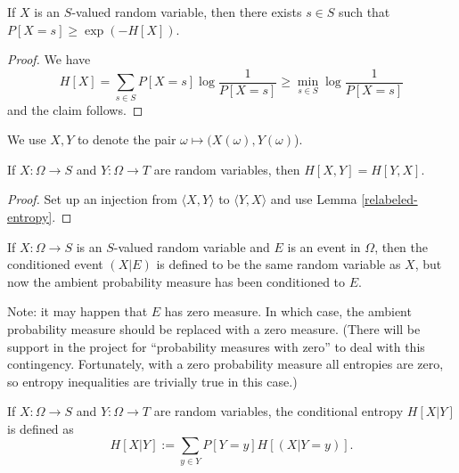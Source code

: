 \begin{lemma}\label{bound-conc}
  If $X$ is an $S$-valued random variable, then there exists $s \in S$ such that $P[X=s] \geq \exp(-H[X])$.
\end{lemma}

\begin{proof}  We have
$$ H[X] = \sum_{s \in S} P[X=s] \log \frac{1}{P[X=s]} \geq \min_{s \in S} \log \frac{1}{P[X=s]}$$
and the claim follows.
\end{proof}

We use $X,Y$ to denote the pair $\omega \mapsto (X(\omega),Y(\omega)$).

\begin{lemma}\label{joint-symm}  If $X: \Omega \to S$ and $Y: \Omega \to T$ are random variables, then $H[X,Y] = H[ Y,X]$.\end{lemma}

\begin{proof} Set up an injection from $\langle X,Y\rangle$ to $\langle Y,X\rangle$ and use Lemma \ref{relabeled-entropy}.
\end{proof}


\begin{definition}\label{condition-event-def}  If $X: \Omega \to S$ is an $S$-valued random variable and $E$ is an event in $\Omega$, then the conditioned event $(X|E)$ is defined to be the same random variable as $X$, but now the ambient probability measure has been conditioned to $E$.
\end{definition}

Note: it may happen that $E$ has zero measure.  In which case, the ambient probability measure should be replaced with a zero measure.  (There will be support in the project for ``probability measures with zero'' to deal with this contingency.  Fortunately, with a zero probability measure all entropies are zero, so entropy inequalities are trivially true in this case.)

\begin{definition}\label{conditional-entropy-def}
    If $X: \Omega \to S$ and $Y: \Omega \to T$ are random variables, the conditional entropy $H[X|Y]$ is defined as
  $$ H[X|Y] := \sum_{y \in Y} P[Y = y] H[(X | Y=y)].$$
\end{definition}

